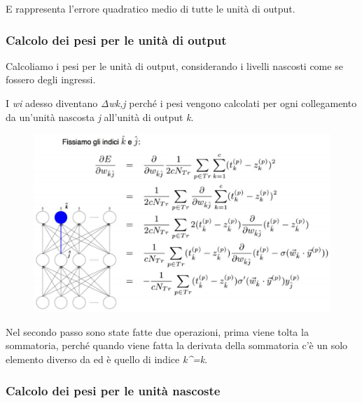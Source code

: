 E rappresenta l'errore quadratico medio di tutte le unità di output.

\subsubsection{Calcolo dei pesi per le unità di
output}\label{calcolo-dei-pesi-per-le-unituxe0-di-output}

Calcoliamo i pesi per le unità di output, considerando i livelli
nascosti come se fossero degli ingressi.

I \emph{wi} adesso diventano \emph{Δwk,j} perché i pesi vengono
calcolati per ogni collegamento da un'unità nascosta \emph{j} all'unità
di output \emph{k}.

\begin{figure}[htbp]
\centering
\includegraphics{./notes/immagini/l10-rete-output.png}
\caption{}
\end{figure}

Nel secondo passo sono state fatte due operazioni, prima viene tolta la
sommatoria, perché quando viene fatta la derivata della sommatoria c'è
un solo elemento diverso da ed è quello di indice \emph{k\^{}=k}.

\subsubsection{Calcolo dei pesi per le unità
nascoste}\label{calcolo-dei-pesi-per-le-unituxe0-nascoste}

